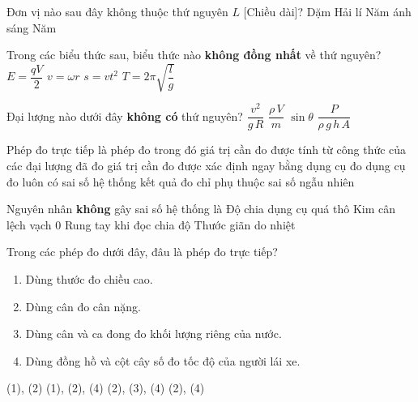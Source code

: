\begin{ex}
	Đơn vị nào sau đây không thuộc thứ nguyên $L$ [Chiều dài]?
	\choice
	{Dặm}
	{Hải lí}
	{Năm ánh sáng}
	{\True Năm}
	\loigiai{}
\end{ex}

\begin{ex}
	Trong các biểu thức sau, biểu thức nào \textbf{không đồng nhất} về thứ nguyên?
	\choice
	{$E = \dfrac{qV}{2}$}
	{$v = \omega r$}
	{\True $s = vt^{2}$}
	{$T = 2\pi\sqrt{\dfrac{l}{g}}$}
\end{ex}

\begin{ex}
	Đại lượng nào dưới đây \textbf{không có} thứ nguyên?
	\choice
	{\(\dfrac{v^{2}}{g\,R}\)}
	{\(\dfrac{\rho\,V}{m}\)}
	{\True \(\sin \theta\)}
	{\(\dfrac{P}{\rho\,g\,h\,A}\)}
\end{ex}

\begin{ex}
	Phép đo trực tiếp là phép đo trong đó
	\choice
	{giá trị cần đo được tính từ công thức của các đại lượng đã đo}
	{\True giá trị cần đo được xác định ngay bằng dụng cụ đo}
	{dụng cụ đo luôn có sai số hệ thống}
	{kết quả đo chỉ phụ thuộc sai số ngẫu nhiên}
\end{ex}

\begin{ex}
	Nguyên nhân \textbf{không} gây sai số hệ thống là
	\choice
	{Độ chia dụng cụ quá thô}
	{Kim cân lệch vạch 0}
	{\True Rung tay khi đọc chia độ}
	{Thước giãn do nhiệt}
	\loigiai{}
\end{ex}

\begin{ex}
	Trong các phép đo dưới đây, đâu là phép đo trực tiếp?
	\begin{enumerate}[label=(\arabic*)]
		\item Dùng thước đo chiều cao.
		\item Dùng cân đo cân nặng.
		\item Dùng cân và ca đong đo khối lượng riêng của nước.
		\item Dùng đồng hồ và cột cây số đo tốc độ của người lái xe.
	\end{enumerate}
	\choice
	{\True (1), (2)}
	{(1), (2), (4)}
	{(2), (3), (4)}
	{(2), (4)}
	\loigiai{}
\end{ex}

